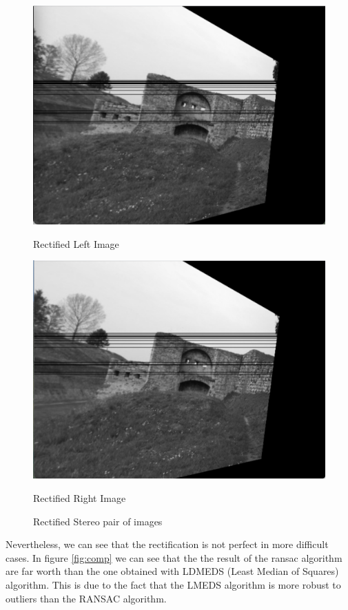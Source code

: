 \documentclass[10pt,twocolumn,letterpaper]{article}
\begin{document}
\begin{figure}
    \centering
    \begin{minipage}[t]{0.32\textwidth}
    \centerline{\includegraphics[width=\textwidth]{rect_left.png}}
    \centerline{Rectified Left Image}
    \end{minipage}
    \hfill
    \begin{minipage}[t]{0.32\textwidth}   
    \centerline{\includegraphics[width=\textwidth]{rect_right.png}}
    \centerline{Rectified Right Image}
    \end{minipage}
    \caption{Rectified Stereo pair of images}
    \label{fig:rectified stereo pair}
\end{figure}
Nevertheless, we can see that the rectification is not perfect in more difficult cases. In figure \ref{fig:comp} we can see that the the result of the ransac algorithm are far worth than the one obtained with LDMEDS (Least Median of Squares) algorithm. This is due to the fact that the LMEDS algorithm is more robust to outliers than the RANSAC algorithm.
\end{document}

